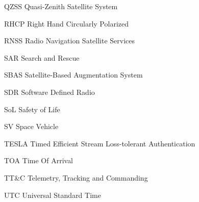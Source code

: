 \begin{abbreviations}
\item[QZSS] Quasi-Zenith Satellite System
\item[RHCP] Right Hand Circularly Polarized
\item[RNSS] Radio Navigation Satellite Services
\item[SAR] Search and Rescue
\item[SBAS] Satellite-Based Augmentation System
\item[SDR] Software Defined Radio
\item[SoL] Safety of Life
\item[SV] Space Vehicle
\item[TESLA] Timed Efficient Stream Loss-tolerant Authentication
\item[TOA] Time Of Arrival
\item[TT&C] Telemetry, Tracking and Commanding
\item[UTC] Universal Standard Time

\end{abbreviations}

